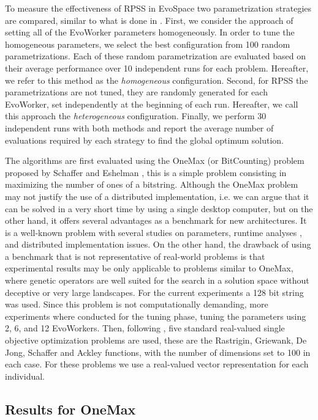 \documentclass[conference]{IEEEtran}
\begin{document}
To measure the effectiveness of RPSS in EvoSpace two parametrization strategies are compared,
similar to what is done in \cite{fuku1,fuku2,garcia2014randomized}. First, we consider the approach of setting all
of the EvoWorker parameters homogeneously. In order to tune the homogeneous parameters,
we select the best configuration from 100 random parametrizations.
Each of these random parametrization are evaluated based on their average performance over 10
independent runs for each problem.
Hereafter, we refer to this method as the {\em homogeneous} configuration.
Second, for RPSS the parametrizations
are not tuned, they are randomly generated for each EvoWorker, set independently at the beginning of each run.
Hereafter, we call this approach the {\em heterogeneous} configuration. Finally, we perform 30 independent runs
with both methods and report the average number of evaluations required by each strategy to find the
global optimum solution.

The algorithms are first evaluated using the OneMax (or BitCounting) problem proposed by
Schaffer and Eshelman \cite{SE91}, this is a simple problem consisting in maximizing the number
of ones of a bitstring. Although the OneMax problem may not justify the use of a distributed
implementation, i.e. we can argue that it can be solved in a very short time by using a
single desktop computer, but on the other hand, it offers several advantages as a
benchmark for new architectures. It is a well-known problem with several
studies on parameters,  runtime analyses \cite{DBLP:journals/corr/MereloGVB15},
and distributed implementation
issues. On the other hand, the drawback of using a benchmark that is not representative of
real-world problems is that experimental results may be only applicable to
problems similar to OneMax, where genetic operators are well suited for the
search in a solution space without deceptive or very large landscapes.
For the current experiments a 128 bit string was used. Since this
problem is not computationally demanding, more experiments where conducted for the tuning phase,
tuning the parameters using 2, 6, and 12 EvoWorkers. Then, following \cite{fuku1},
five standard real-valued single objective optimization problems
are used, these are the Rastrigin, Griewank, De Jong, Schaffer  and Ackley functions,
with the number of dimensions set to 100 in each case. For these problems we use a real-valued vector
representation for each individual.

\subsection{Results for OneMax}
\end{document}
